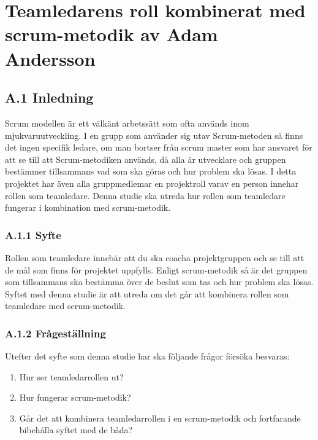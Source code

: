\chapter{Teamledarens roll kombinerat med scrum-metodik av Adam Andersson}

\section{A.1 Inledning}
Scrum modellen är ett välkänt arbetssätt som ofta används inom mjukvaruutveckling. I en grupp som använder sig utav Scrum-metoden så finns det ingen specifik ledare, om man bortser från scrum master som har ansvaret för att se till att Scrum-metodiken används, då alla är utvecklare och gruppen bestämmer tillsammans vad som ska göras och hur problem ska lösas.
I detta projektet har även alla gruppmedlemar en projektroll varav en person innehar rollen som teamledare. Denna studie ska utreda hur rollen som teamledare fungerar i kombination med scrum-metodik.

\subsection{A.1.1 Syfte}
Rollen som teamledare innebär att du ska coacha projektgruppen och se till att de mål som finns för projektet uppfylls. Enligt scrum-metodik så är det gruppen som tillsammans ska bestämma över de beslut som tas och hur problem ska lösas. Syftet med denna studie är att utreda om det går att kombinera rollen som teamledare med scrum-metodik.

\subsection{A.1.2 Frågeställning}
Utefter det syfte som denna studie har ska följande frågor försöka besvaras:

\begin{enumerate}
	\item Hur ser teamledarrollen ut?
	\item Hur fungerar scrum-metodik?
	\item Går det att kombinera teamledarrollen i en scrum-metodik och fortfarande bibehålla syftet med de båda? 
\end{enumerate}

